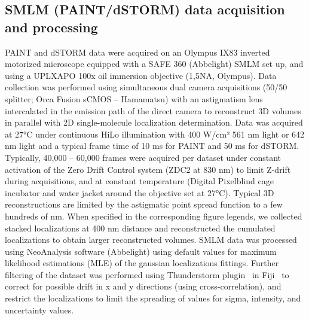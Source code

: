 \subsection{SMLM (PAINT/dSTORM) data acquisition and processing}

PAINT and dSTORM data were acquired on an Olympus IX83 inverted motorized microscope equipped with a SAFE 360 (Abbelight) SMLM set up, and using a UPLXAPO 100x oil immersion objective (1,5NA, Olympus\texttrademark).
Data collection was performed using simultaneous dual camera acquisitions (50/50 splitter; Orca Fusion sCMOS -- Hamamatsu\texttrademark) with an astigmatism lens intercalated in the emission path of the direct camera to reconstruct 3D volumes in parallel with 2D single-molecule localization determination.
Data was acquired at 27°C under continuous HiLo illumination with 400 W/cm² 561 nm light or 642 nm light and a typical frame time of 10 ms for PAINT and 50 ms for dSTORM.
Typically, 40,000 -- 60,000 frames were acquired per dataset under constant activation of the Zero Drift Control system (ZDC2 at 830 nm) to limit Z-drift during acquisitions, and at constant temperature (Digital Pixel\texttrademark blind cage incubator and water jacket around the objective set at 27°C).
Typical 3D reconstructions are limited by the astigmatic point spread function to a few hundreds of nm.
When specified in the corresponding figure legends, we collected stacked localizations at 400 nm distance and reconstructed the cumulated localizations to obtain larger reconstructed volumes.
SMLM data was processed using NeoAnalysis software (Abbelight\texttrademark) using default values for maximum likelihood estimations (MLE) of the gaussian localizations fittings.
Further filtering of the dataset was performed using Thunderstorm plugin~\cite{ovesnyThunderSTORMComprehensiveImageJ2014} in Fiji~\cite{schindelinFijiOpensourcePlatform2012} to correct for possible drift in x and y directions (using cross-correlation), and restrict the localizations to limit the spreading of values for sigma, intensity, and uncertainty values.

